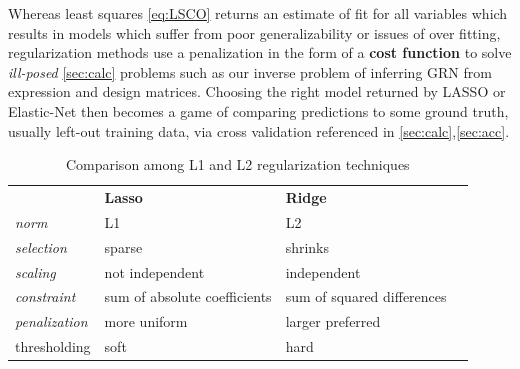Whereas least squares \cref{eq:LSCO} returns an estimate of fit for all variables which results in models which suffer from poor generalizability or issues of over fitting, regularization methods use a penalization in the form of a \textbf{cost function} to solve \emph{ill-posed} \cref{sec:calc} problems such as our inverse problem of inferring GRN from expression and design matrices. Choosing the right model returned by LASSO or Elastic-Net then becomes a game of comparing predictions to some ground truth, usually left-out training data, \ie via cross validation referenced in \cref{sec:calc},\cref{sec:acc}.

\begin{table}[H]
\begin{tabular}{|l|l|l|l}
\cline{1-3}
 & \textbf{Lasso} &  \textbf{Ridge} &  \\ \cline{1-3}
\textit{norm} & L1 &  L2 &  \\ \cline{1-3}
\textit{selection} & sparse  & shrinks &  \\ \cline{1-3}
\textit{scaling} & not independent &  independent &  \\ \cline{1-3}
\textit{constraint} &sum of absolute coefficients& sum of squared differences&  \\ \cline{1-3}
\textit{penalization} & more uniform &  larger preferred &  \\ \cline{1-3}
thresholding & soft &  hard &  \\ \cline{1-3}
\end{tabular}
\caption{Comparison among L1 and L2 regularization techniques}
\label{table:regularization}
\end{table}

